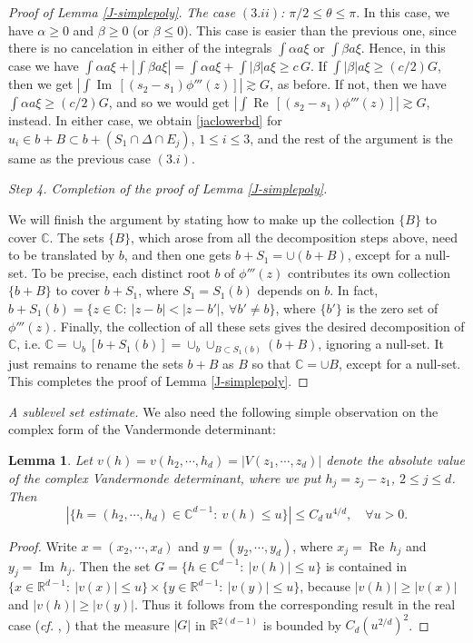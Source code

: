 \documentclass[11 pt]{amsart}
\theoremstyle{plain}
\newtheorem{lemma}[theorem]{Lemma}
\numberwithin{equation}{section}
\theoremstyle{plain}
\numberwithin{equation}{section}
\theoremstyle{remark}
\begin{document}
\begin{proof}[Proof of Lemma \ref{J-simplepoly}]
{\sl The case $(3.ii)$: $\pi/2 \le \theta \le \pi$}.
In this case, we have $\alpha \ge 0$ and $\beta \ge 0$ (or $\beta \le 0$).
This case is easier than the previous one, since there is no cancelation in either of the integrals $\int\alpha a \xi$ or $\int \beta a \xi$. Hence, in this case we have $\int \alpha a \xi + |\int \beta a \xi| = \int \alpha a \xi + \int |\beta| a \xi \ge c\, G$. If $\int |\beta| a \xi \ge (c/2) G$, then we get $|\int{\operatorname{Im\,}}[(s_2-s_1)\phi'''(z)]| {\gtrsim} G$, as before. If not, then we have $\int\alpha a \xi \ge (c/2) G$, and so we would get $|\int{\operatorname{Re\,}} [(s_2-s_1)\phi'''(z)]| {\gtrsim} G$, instead. In either case, we obtain \eqref{jaclowerbd} for $u_i \in b+ B \subset b+ (S_1 \cap\Delta \cap E_j)$, $1\le i\le 3$, and the rest of the argument is the same as the previous case $(3.i)$.
\medskip

\noindent
{\sl Step 4. Completion of the proof of Lemma \ref{J-simplepoly}.}

We will finish the argument by stating how to make up the collection $\{ B \}$ to cover ${{\mathbb {C}}}$. The sets $\{ B \}$, which arose from all the decomposition steps above, need to be translated by $b$, and then one gets $b+S_1 = \cup (b+ B)$, except for a null-set.
To be precise, each distinct root $b$ of $\phi'''(z)$ contributes its own collection $\{ b+ B \}$ to cover $b+ S_1$, where $S_1 = S_1(b)$ depends on $b$. In fact, $b+S_1(b) = \{ z\in {{\mathbb {C}}}: ~ |z-b| < |z- b'|, ~ \forall b' \not= b\}$, where $\{ b'\}$ is the zero set of $\phi'''(z)$. Finally, the collection of all these sets gives the desired decomposition of ${{\mathbb {C}}}$, i.e. ${{\mathbb {C}}} = \cup_b [b+S_1(b)] = \cup_b \cup_{B\subset S_1(b)} (b+ B)$, ignoring a null-set. It just remains to rename the sets $b+B$ as $B$ so that ${{\mathbb {C}}} = \cup B$, except for a null-set. This completes the proof of Lemma \ref{J-simplepoly}.
\end{proof}

{\sl A sublevel set estimate.}
We also need the following simple observation on the complex form of the Vandermonde determinant:
\begin{lemma}\label{VdMbound}
Let $v(h)=v(h_2, \cdots, h_d) = |V(z_1, \cdots, z_d)|$ denote the absolute value of the
complex Vandermonde determinant, where we put $h_j = z_j-z_1$,
$2\le j\le d$. Then
\[ |\{ h = (h_2, \cdots, h_d) \in {{\mathbb {C}}}^{d-1}: \ v(h) \le u\}| \le C_d \,
u^{4/d}, \quad \forall u>0 .
\]
\end{lemma}
\begin{proof}
Write $x=(x_2, \cdots, x_d)$ and $y=(y_2, \cdots, y_d)$, where
$x_j = {\operatorname{Re\,}} h_j$ and $y_j = {\operatorname{Im\,}} h_j$. Then the set $G = \{ h \in
{{\mathbb {C}}}^{d-1}: \ |v(h)| \le u\}$ is contained in $\{ x\in {{\mathbb {R}}}^{d-1}:
\ |v(x)| \le u\} \times \{ y\in {{\mathbb {R}}}^{d-1}: \ |v(y)| \le u\}$,
because $|v(h)| \ge |v(x)|$ and $|v(h)| \ge |v(y)|$. Thus it
follows from the corresponding result in the real case ({\it cf.}
\cite{DM1}, \cite{BOS1}) that the measure $|G|$ in ${{\mathbb {R}}}^{2(d-1)}$
is bounded by $C_d (u^{2/d})^2$.
\end{proof}
\end{document}

